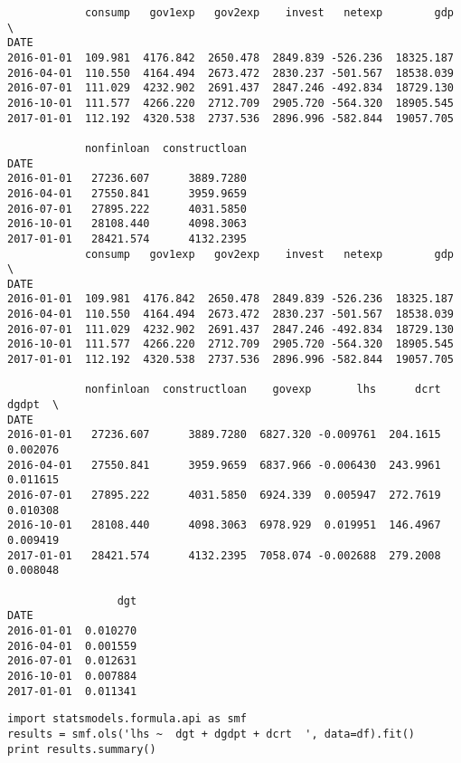 \documentclass[12pt,fleqn]{article}\usepackage{../../common}
\begin{document}
\begin{verbatim}
            consump   gov1exp   gov2exp    invest   netexp        gdp  \
DATE                                                                    
2016-01-01  109.981  4176.842  2650.478  2849.839 -526.236  18325.187   
2016-04-01  110.550  4164.494  2673.472  2830.237 -501.567  18538.039   
2016-07-01  111.029  4232.902  2691.437  2847.246 -492.834  18729.130   
2016-10-01  111.577  4266.220  2712.709  2905.720 -564.320  18905.545   
2017-01-01  112.192  4320.538  2737.536  2896.996 -582.844  19057.705   

            nonfinloan  constructloan  
DATE                                   
2016-01-01   27236.607      3889.7280  
2016-04-01   27550.841      3959.9659  
2016-07-01   27895.222      4031.5850  
2016-10-01   28108.440      4098.3063  
2017-01-01   28421.574      4132.2395  
            consump   gov1exp   gov2exp    invest   netexp        gdp  \
DATE                                                                    
2016-01-01  109.981  4176.842  2650.478  2849.839 -526.236  18325.187   
2016-04-01  110.550  4164.494  2673.472  2830.237 -501.567  18538.039   
2016-07-01  111.029  4232.902  2691.437  2847.246 -492.834  18729.130   
2016-10-01  111.577  4266.220  2712.709  2905.720 -564.320  18905.545   
2017-01-01  112.192  4320.538  2737.536  2896.996 -582.844  19057.705   

            nonfinloan  constructloan    govexp       lhs      dcrt     dgdpt  \
DATE                                                                            
2016-01-01   27236.607      3889.7280  6827.320 -0.009761  204.1615  0.002076   
2016-04-01   27550.841      3959.9659  6837.966 -0.006430  243.9961  0.011615   
2016-07-01   27895.222      4031.5850  6924.339  0.005947  272.7619  0.010308   
2016-10-01   28108.440      4098.3063  6978.929  0.019951  146.4967  0.009419   
2017-01-01   28421.574      4132.2395  7058.074 -0.002688  279.2008  0.008048   

                 dgt  
DATE                  
2016-01-01  0.010270  
2016-04-01  0.001559  
2016-07-01  0.012631  
2016-10-01  0.007884  
2017-01-01  0.011341  
\end{verbatim}

\begin{verbatim}
import statsmodels.formula.api as smf
results = smf.ols('lhs ~  dgt + dgdpt + dcrt  ', data=df).fit()
print results.summary()
\end{verbatim}
\end{document}
